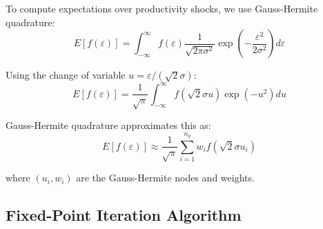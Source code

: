 \documentclass[11pt]{article}
\theoremstyle{definition}
\begin{document}
To compute expectations over productivity shocks, we use Gauss-Hermite quadrature:
\begin{equation}
E[f(\varepsilon)] = \int_{-\infty}^{\infty} f(\varepsilon) \frac{1}{\sqrt{2\pi\sigma^2}} \exp\left(-\frac{\varepsilon^2}{2\sigma^2}\right) d\varepsilon
\end{equation}

Using the change of variable $u = \varepsilon/(\sqrt{2}\sigma)$:
\begin{equation}
E[f(\varepsilon)] = \frac{1}{\sqrt{\pi}} \int_{-\infty}^{\infty} f(\sqrt{2}\sigma u) \exp(-u^2) du
\end{equation}

Gauss-Hermite quadrature approximates this as:
\begin{equation}
E[f(\varepsilon)] \approx \frac{1}{\sqrt{\pi}} \sum_{i=1}^{n_q} w_i f(\sqrt{2}\sigma u_i)
\end{equation}

where $(u_i, w_i)$ are the Gauss-Hermite nodes and weights.

\subsection{Fixed-Point Iteration Algorithm}
\end{document}
